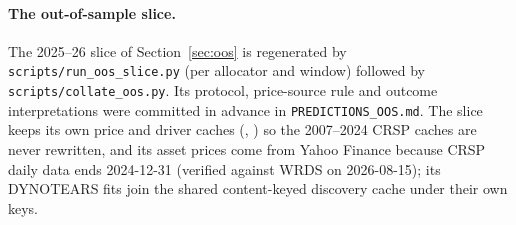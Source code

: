 \paragraph{The out-of-sample slice.} The 2025--26 slice of
Section~\ref{sec:oos} is regenerated by
\texttt{scripts/run\_oos\_slice.py} (per allocator and window) followed
by \texttt{scripts/collate\_oos.py}. Its protocol, price-source rule
and outcome interpretations were committed in advance in
\texttt{PREDICTIONS\_OOS.md}. The slice keeps its own price and driver
caches (, ) so the
2007--2024 CRSP caches are never rewritten, and its asset prices come
from Yahoo Finance because CRSP daily data ends 2024-12-31 (verified
against WRDS on 2026-08-15); its DYNOTEARS fits join the shared
content-keyed discovery cache under their own keys.
